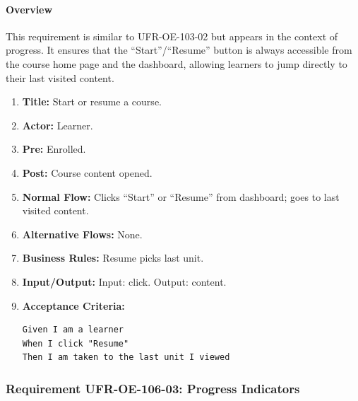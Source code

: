 \paragraph{Overview}
This requirement is similar to UFR-OE-103-02 but appears in the context of progress. It ensures that the “Start”/“Resume” button is always accessible from the course home page and the dashboard, allowing learners to jump directly to their last visited content.
\begin{enumerate}[label=\textbf{\arabic*.}]
\item \textbf{Title:} Start or resume a course.
\item \textbf{Actor:} Learner.
\item \textbf{Pre:} Enrolled.
\item \textbf{Post:} Course content opened.
\item \textbf{Normal Flow:} Clicks “Start” or “Resume” from dashboard; goes to last visited content.
\item \textbf{Alternative Flows:} None.
\item \textbf{Business Rules:} Resume picks last unit.
\item \textbf{Input/Output:} Input: click. Output: content.
\item \textbf{Acceptance Criteria:}
    \begin{verbatim}
Given I am a learner
When I click "Resume"
Then I am taken to the last unit I viewed
    \end{verbatim}
\end{enumerate}

\subsubsection{Requirement UFR-OE-106-03: Progress Indicators}
